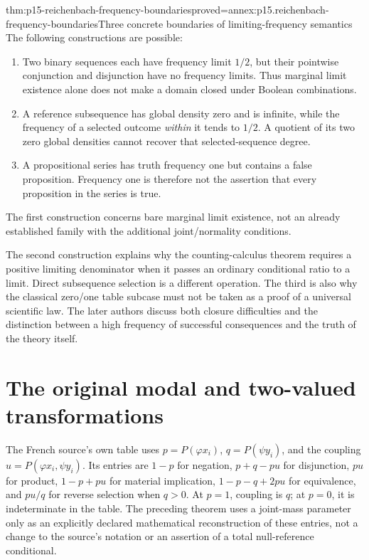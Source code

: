 \begin{hbtheorem}{thm:p15-reichenbach-frequency-boundaries}{proved=annex:p15.reichenbach-frequency-boundaries}{Three concrete boundaries of limiting-frequency semantics}
The following constructions are possible:
\begin{enumerate}
\item Two binary sequences each have frequency limit \(1/2\), but
      their pointwise conjunction and disjunction have no frequency
      limits. Thus marginal limit existence alone does not make a
      domain closed under Boolean combinations.
\item A reference subsequence has global density zero and is infinite,
      while the frequency of a selected outcome \emph{within} it tends
      to \(1/2\). A quotient of its two zero global densities cannot
      recover that selected-sequence degree.
\item A propositional series has truth frequency one but contains a
      false proposition. Frequency one is therefore not the assertion
      that every proposition in the series is true.
\end{enumerate}
The first construction concerns bare marginal limit existence, not an
already established family with the additional joint/normality conditions.
\end{hbtheorem}

The second construction explains why the counting-calculus theorem
requires a positive limiting denominator when it passes an ordinary
conditional ratio to a limit. Direct subsequence selection is a different
operation. The third is also why the classical zero/one table subcase
must not be taken as a proof of a universal scientific law. The later
authors discuss both closure difficulties and the distinction between
a high frequency of successful consequences and the truth of the
theory itself.

\section{The original modal and two-valued transformations}
\label{sec:p15-reichenbach-modal-transformations}

The French source's own table uses \(p=P(\varphi x_i)\),
\(q=P(\psi y_i)\), and the coupling
\(u=P(\varphi x_i,\psi y_i)\). Its entries are
\(1-p\) for negation, \(p+q-pu\) for disjunction, \(pu\)
for product, \(1-p+pu\) for material implication,
\(1-p-q+2pu\) for equivalence, and \(pu/q\) for reverse
selection when \(q>0\). At \(p=1\), coupling is \(q\);
at \(p=0\), it is indeterminate in the table. The preceding
theorem uses a joint-mass parameter only as an explicitly declared
mathematical reconstruction of these entries, not a change to the
source's notation or an assertion of a total null-reference conditional.

